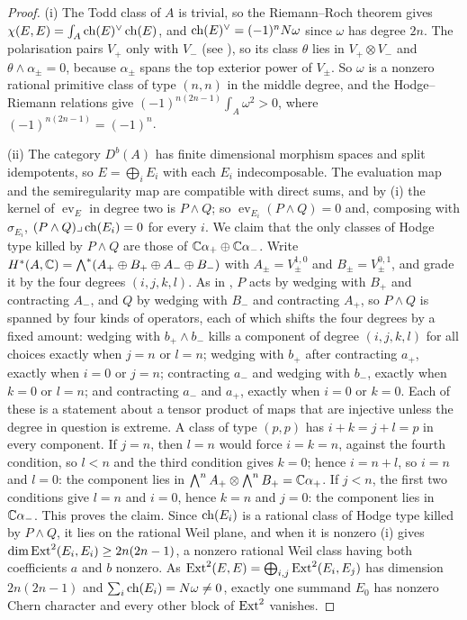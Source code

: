 \begin{proof}
(i) The Todd class of $A$ is trivial, so the Riemann--Roch theorem gives
$\chi(E,E)=\int_{A}\operatorname{ch}(E)^{\vee}\operatorname{ch}(E)$, and $\operatorname{ch}(E)^{\vee}=(-1)^{n}N\omega$
since $\omega$ has degree $2n$. The polarisation pairs $V_{+}$ only with
$V_{-}$ (see \cite[Figure~9]{paperI}), so its class $\theta$ lies in
$V_{+}\otimes V_{-}$ and $\theta\wedge\alpha_{\pm}=0$, because $\alpha_{\pm}$
spans the top exterior power of $V_{\pm}$. So $\omega$ is a nonzero rational
primitive class of type $(n,n)$ in the middle degree, and the Hodge--Riemann
relations give $(-1)^{n(2n-1)}\int_{A}\omega^{2}>0$, where
$(-1)^{n(2n-1)}=(-1)^{n}$.

(ii) The category $D^{b}(A)$ has finite dimensional morphism spaces and split
idempotents, so $E=\bigoplus_{i}E_{i}$ with each $E_{i}$ indecomposable. The
evaluation map and the semiregularity map are compatible with direct sums,
and by (i) the kernel of $\operatorname{ev}_{E}$ in
degree two is $P\wedge Q$; so $\operatorname{ev}_{E_{i}}(P\wedge Q)=0$ and,
composing with $\sigma_{E_{i}}$, $(P\wedge Q)\lrcorner\operatorname{ch}(E_{i})=0$ for every
$i$. We claim that the only classes of Hodge type killed by $P\wedge Q$ are
those of $\mathbb{C}\alpha_{+}\oplus\mathbb{C}\alpha_{-}$. Write
$H^{*}(A,\mathbb{C})=\bigwedge^{*}(A_{+}\oplus B_{+}\oplus A_{-}\oplus B_{-})$ with
$A_{\pm}=V_{\pm}^{1,0}$ and $B_{\pm}=V_{\pm}^{0,1}$, and grade it by the four
degrees $(i,j,k,l)$. As in , $P$ acts by wedging with $B_{+}$
and contracting $A_{-}$, and $Q$ by wedging with $B_{-}$ and contracting
$A_{+}$, so $P\wedge Q$ is spanned by four kinds of operators, each of which
shifts the four degrees by a fixed amount: wedging with $b_{+}\wedge b_{-}$
kills a component of degree $(i,j,k,l)$ for all choices exactly when $j=n$ or
$l=n$; wedging with $b_{+}$ after contracting $a_{+}$, exactly when $i=0$ or
$j=n$; contracting $a_{-}$ and wedging with $b_{-}$, exactly when $k=0$ or
$l=n$; and contracting $a_{-}$ and $a_{+}$, exactly when $i=0$ or $k=0$. Each
of these is a statement about a tensor product of maps that are injective
unless the degree in question is extreme. A class of type $(p,p)$ has
$i+k=j+l=p$ in every component. If $j=n$, then $l=n$ would force $i=k=n$,
against the fourth condition, so $l<n$ and the third condition gives $k=0$;
hence $i=n+l$, so $i=n$ and $l=0$: the component lies in
$\bigwedge^{n}A_{+}\otimes\bigwedge^{n}B_{+}=\mathbb{C}\alpha_{+}$. If $j<n$, the
first two conditions give $l=n$ and $i=0$, hence $k=n$ and $j=0$: the
component lies in $\mathbb{C}\alpha_{-}$. This proves the claim. Since $\operatorname{ch}(E_{i})$ is a rational class of
Hodge type killed by $P\wedge Q$, it lies on the rational Weil plane, and
when it is nonzero (i) gives
$\dim\operatorname{Ext}^{2}(E_{i},E_{i})\ge2n(2n-1)$, a nonzero rational Weil class having
both coefficients $a$ and $b$ nonzero. As
$\operatorname{Ext}^{2}(E,E)=\bigoplus_{i,j}\operatorname{Ext}^{2}(E_{i},E_{j})$ has dimension
$2n(2n-1)$ and $\sum_{i}\operatorname{ch}(E_{i})=N\omega\ne0$, exactly one summand $E_{0}$
has nonzero Chern character and every other block of $\operatorname{Ext}^{2}$ vanishes.


\end{proof}
